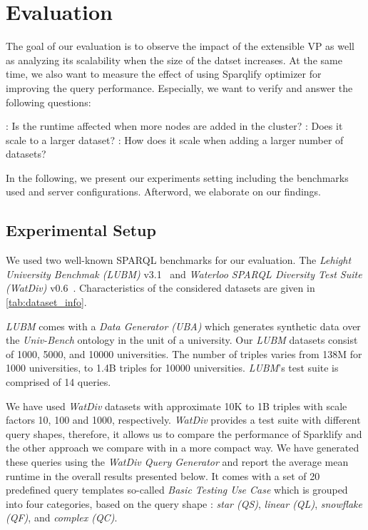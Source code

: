\section{Evaluation}
\label{sec:evaluation}

The goal of our evaluation is to observe the impact of the extensible VP as well as analyzing its scalability when the size of the datset increases.
At the same time, we also want to measure the effect of using Sparqlify optimizer for improving the query performance.
Especially, we want to verify and answer the following questions:
\begin{itemize}
\addtolength{\itemindent}{1cm}
    \newitem[Q1]\label{item:Q1}: Is the runtime affected when more nodes are added in the cluster?
    \newitem[Q2]\label{item:Q2}: Does it scale to a larger dataset?
    \newitem[Q3]\label{item:Q3}: How does it scale when adding a larger number of datasets?
\end{itemize}
In the following, we present our experiments setting including the benchmarks used and server configurations. 
Afterword, we elaborate on our findings.

\subsection{Experimental Setup}
We used two well-known SPARQL benchmarks for our evaluation. 
The \textit{Lehight University Benchmak (LUBM)} v3.1~\cite{Guo2005LUBMAB} and \textit{Waterloo SPARQL Diversity Test Suite (WatDiv)} v0.6~\cite{Alu2014DiversifiedST}.
Characteristics of the considered datasets are given in \autoref{tab:dataset_info}.

\textit{LUBM} comes with a \textit{Data Generator (UBA)} which generates synthetic data over the \textit{Univ-Bench} ontology in the unit of a university.
Our \textit{LUBM} datasets consist of 1000, 5000, and 10000 universities.
The number of triples varies from 138M for 1000 universities, to 1.4B triples for 10000 universities.
\textit{LUBM}'s test suite is comprised of 14 queries. %

We have used \textit{WatDiv} datasets with approximate 10K to 1B triples with scale factors 10, 100 and 1000, respectively. 
\textit{WatDiv} provides a test suite with different query shapes, therefore, it allows us to compare the performance of Sparklify and the other approach we compare with in a more compact way.
We have generated these queries using the \textit{WatDiv Query Generator} and report the average mean runtime in the overall results presented below.
It comes with a set of 20 predefined query templates so-called \textit{Basic Testing Use Case} which is grouped into four categories, based on the query shape : \textit{star (QS)}, \textit{linear (QL)}, \textit{snowflake (QF)}, and \textit{complex (QC)}.


